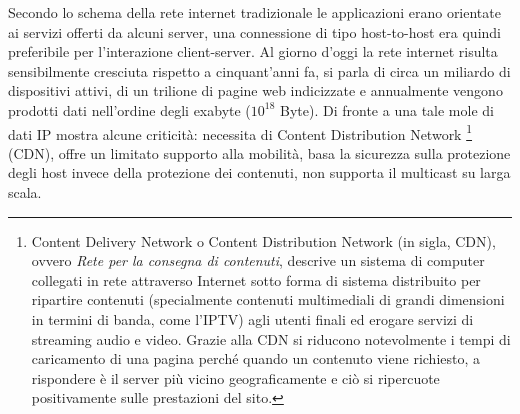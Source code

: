 	Secondo lo schema della rete internet tradizionale le applicazioni erano orientate ai servizi offerti da alcuni server, una connessione di tipo host-to-host era quindi preferibile per l'interazione client-server.
	Al giorno d'oggi la rete internet risulta sensibilmente cresciuta rispetto a cinquant'anni fa, si parla di circa un miliardo di dispositivi attivi, di un trilione di pagine web indicizzate e annualmente vengono prodotti dati nell'ordine degli exabyte ($10^{18}$ Byte).
	Di fronte a una tale mole di dati IP mostra alcune criticità: necessita di Content Distribution Network
	\footnote{Content Delivery Network o Content Distribution Network (in sigla, CDN), ovvero \emph{Rete per la consegna di contenuti}, descrive un sistema di computer collegati in rete attraverso Internet sotto forma di sistema distribuito per ripartire contenuti (specialmente contenuti multimediali di grandi dimensioni in termini di banda, come l'IPTV) agli utenti finali ed erogare servizi di streaming audio e video.
	Grazie alla CDN si riducono notevolmente i tempi di caricamento di una pagina perché quando un contenuto viene richiesto, a rispondere è il server più vicino geograficamente e ciò si ripercuote positivamente sulle prestazioni del sito.}
	(CDN), offre un limitato supporto alla mobilità, basa la sicurezza sulla protezione degli host invece della protezione dei contenuti, non supporta il multicast su larga scala.
	